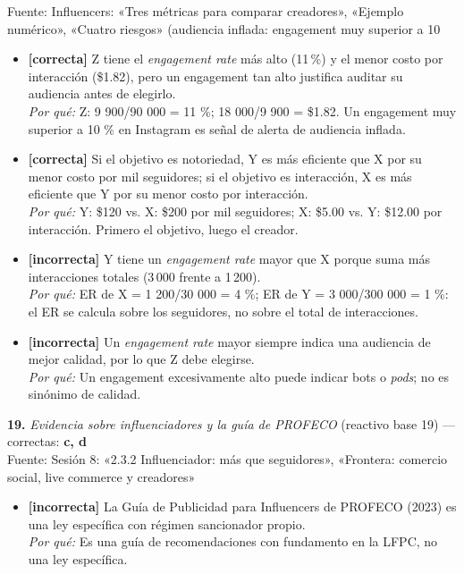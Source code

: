 \documentclass[10pt,letterpaper]{article}
\begin{document}
{\scriptsize Fuente: Influencers: «Tres métricas para comparar creadores», «Ejemplo numérico», «Cuatro riesgos» (audiencia inflada: engagement muy superior a 10 %
\begin{itemize}[leftmargin=1.2em,itemsep=0pt,topsep=1pt,parsep=0pt]
\item[\textbf{a)}] {\footnotesize \textbf{[correcta]} Z tiene el \textit{engagement rate} más alto (11\,\%) y el menor costo por interacción (\$1.82), pero un engagement tan alto justifica auditar su audiencia antes de elegirlo.\\ \textit{Por qué:} Z: 9 900/90 000 = 11 \%; 18 000/9 900 = \$1.82. Un engagement muy superior a 10 \% en Instagram es señal de alerta de audiencia inflada.}
\item[\textbf{b)}] {\footnotesize \textbf{[correcta]} Si el objetivo es notoriedad, Y es más eficiente que X por su menor costo por mil seguidores; si el objetivo es interacción, X es más eficiente que Y por su menor costo por interacción.\\ \textit{Por qué:} Y: \$120 vs. X: \$200 por mil seguidores; X: \$5.00 vs. Y: \$12.00 por interacción. Primero el objetivo, luego el creador.}
\item[\textbf{c)}] {\footnotesize \textbf{[incorrecta]} Y tiene un \textit{engagement rate} mayor que X porque suma más interacciones totales (3\,000 frente a 1\,200).\\ \textit{Por qué:} ER de X = 1 200/30 000 = 4 \%; ER de Y = 3 000/300 000 = 1 \%: el ER se calcula sobre los seguidores, no sobre el total de interacciones.}
\item[\textbf{d)}] {\footnotesize \textbf{[incorrecta]} Un \textit{engagement rate} mayor siempre indica una audiencia de mejor calidad, por lo que Z debe elegirse.\\ \textit{Por qué:} Un engagement excesivamente alto puede indicar bots o \textit{pods}; no es sinónimo de calidad.}
\end{itemize}
\vspace{3pt}\noindent\textbf{19.} \textit{Evidencia sobre influenciadores y la guía de PROFECO} (reactivo base 19) — correctas: \textbf{c, d}\\[-1pt]
{\scriptsize Fuente: Sesión 8: «2.3.2 Influenciador: más que seguidores», «Frontera: comercio social, live commerce y creadores»}
\begin{itemize}[leftmargin=1.2em,itemsep=0pt,topsep=1pt,parsep=0pt]
\item[\textbf{a)}] {\footnotesize \textbf{[incorrecta]} La Guía de Publicidad para Influencers de PROFECO (2023) es una ley específica con régimen sancionador propio.\\ \textit{Por qué:} Es una guía de recomendaciones con fundamento en la LFPC, no una ley específica.}

\end{itemize}}
\end{document}

